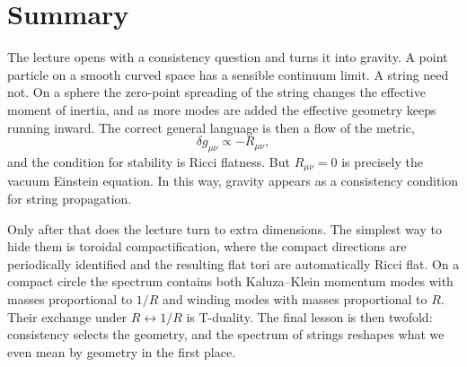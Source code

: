 \section{Summary}

The lecture opens with a consistency question and turns it into gravity. A point particle on a smooth curved space has a sensible continuum limit. A string need not. On a sphere the zero-point spreading of the string changes the effective moment of inertia, and as more modes are added the effective geometry keeps running inward. The correct general language is then a flow of the metric,
\[
\delta g_{\mu\nu}\propto -R_{\mu\nu},
\]
and the condition for stability is Ricci flatness. But \(R_{\mu\nu}=0\) is precisely the vacuum Einstein equation. In this way, gravity appears as a consistency condition for string propagation.

Only after that does the lecture turn to extra dimensions. The simplest way to hide them is toroidal compactification, where the compact directions are periodically identified and the resulting flat tori are automatically Ricci flat. On a compact circle the spectrum contains both Kaluza--Klein momentum modes with masses proportional to \(1/R\) and winding modes with masses proportional to \(R\). Their exchange under \(R\leftrightarrow 1/R\) is T-duality. The final lesson is then twofold: consistency selects the geometry, and the spectrum of strings reshapes what we even mean by geometry in the first place.